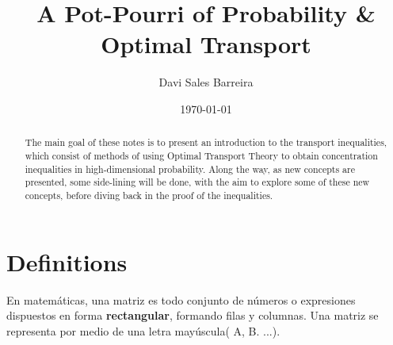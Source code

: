 \documentclass[10pt]{article}
\title{A Pot-Pourri of Probability \& Optimal Transport}
\author{Davi Sales Barreira}
\date{\today}
\begin{document}
\maketitle \tableofcontents 


\begin{abstract}
The main goal of these notes is to present an introduction to the transport inequalities,
which consist of methods of using Optimal Transport Theory to obtain concentration
inequalities in high-dimensional probability. Along the way, as new concepts are presented,
some side-lining will be done, with the aim to explore some of these new concepts, before
diving back in the proof of the inequalities.
\end{abstract}

\section{Definitions}
En matemáticas, una matriz es todo conjunto de números o expresiones dispuestos en forma \textbf{rectangular}, formando filas y columnas. Una matriz se representa por medio de una letra mayúscula( A, B. ...).


 
 
\end{document}
